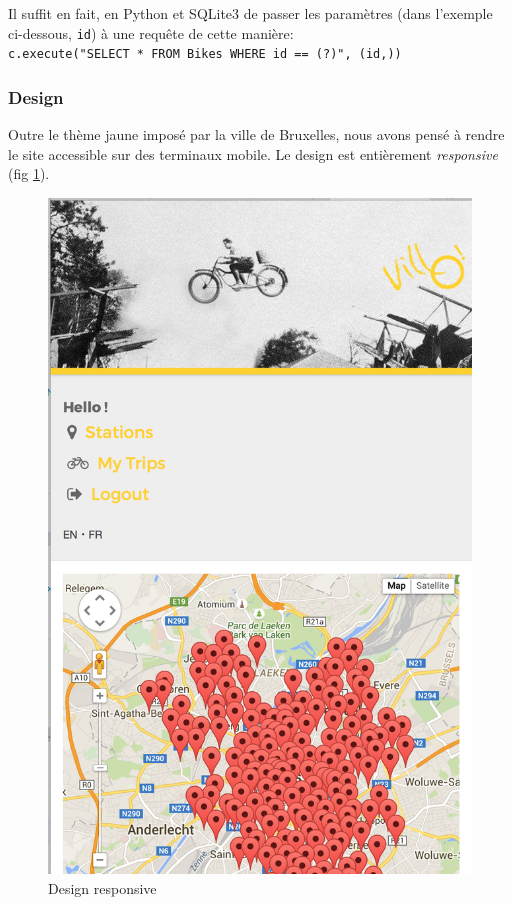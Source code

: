 \documentclass[a4paper]{article}
\begin{document}
    Il suffit en fait, en Python et SQLite3 de passer les paramètres (dans l'exemple ci-dessous, \texttt{id}) à une requête de cette manière:\\

    \texttt{c.execute("SELECT * FROM Bikes WHERE id == (?)", (id,))}\\

    
    \subsubsection{Design}
    Outre le thème jaune imposé par la ville de Bruxelles, nous avons pensé à rendre le site accessible sur des terminaux mobile. Le design est entièrement \textit{responsive} (fig \ref{fig-s23}).
    
    \begin{figure}
    \begin{center}
    \includegraphics[width=\textwidth/2]{images/s23.png}
    \end{center}
    \caption{Design responsive}
    \label{fig-s23}
    \end{figure}
   
\end{document}
